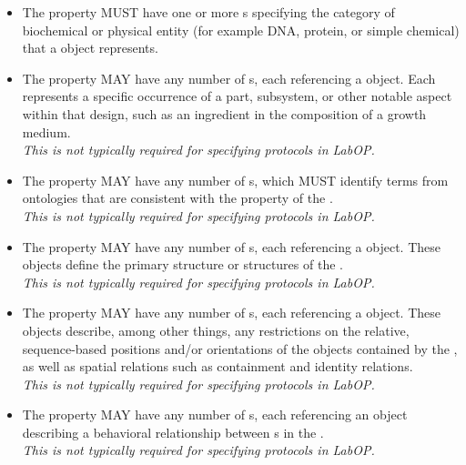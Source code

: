\begin{itemize}
\item \label{sec:sbol:type:C}
The  property MUST have one or more s specifying the category of biochemical or physical entity (for example DNA, protein, or simple chemical) that a  object represents.

\item \label{sec:sbol:hasFeature}
The  property MAY have any number of s, each referencing a  object. Each  represents a specific occurrence of a part, subsystem, or other notable aspect within that design, such as an ingredient in the composition of a growth medium.
\\{\em This is not typically required for specifying protocols in LabOP.}

\item \label{sec:sbol:role:C}
The  property MAY have any number of s, which MUST identify terms from ontologies that are consistent with the  property of the . 
\\{\em This is not typically required for specifying protocols in LabOP.}

\item \label{sec:sbol:hasSequence:C}
The  property MAY have any number of s, each referencing a  object.  These objects define the primary structure or structures of the .
\\{\em This is not typically required for specifying protocols in LabOP.}

\item \label{sec:sbol:hasConstraint}
The  property MAY have any number of s, each referencing a  object.
These objects describe, among other things, any restrictions on the relative, sequence-based positions and/or orientations of the  objects contained by the , as well as spatial relations such as containment and identity relations.
\\{\em This is not typically required for specifying protocols in LabOP.}

\item \label{sec:sbol:hasInteraction}
The  property MAY have any number of s, each referencing an  object describing a behavioral relationship between s in the .
\\{\em This is not typically required for specifying protocols in LabOP.}


\end{itemize}
